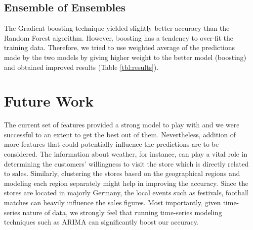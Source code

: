 \documentclass[12pt,a4paper]{article}
\begin{document}
\subsection{Ensemble of Ensembles}
\label{ens}
The Gradient boosting technique yielded slightly better accuracy than the Random Forest algorithm. However, boosting has a tendency to over-fit the training data\cite{wiki_rf}\cite{wiki_bo}. Therefore, we tried to use weighted average of the predictions made by the two models by giving higher weight to the better model (boosting) and obtained improved results (Table \ref{tbl:results}). 

\begin{table}[H]
	\centering
	\caption{RMSPE rates for different algorithms and data combinations}
	\label{tbl:results}
\end{table}

\section{Future Work}
The current set of features provided a strong model to play with and we were successful to an extent to get the best out of them. Nevertheless, addition of more features that could potentially influence the predictions are to be considered. The information about weather, for instance, can play a vital role in determining the customers' willingness to visit the store which is directly related to sales. Similarly, clustering the stores based on the geographical regions and modeling each region separately might help in improving the accuracy. Since the stores  are located in majorly Germany, the local events such as festivals, football matches can heavily influence the sales figures. Most importantly, given time-series nature of data, we strongly feel that running time-series modeling techniques such as ARIMA\cite{arima} can significantly boost our accuracy.
\end{document}
